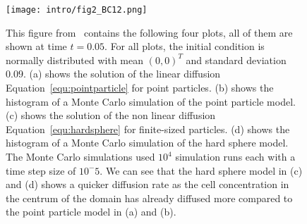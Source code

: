 \begin{figure}[t!]
	\centering
    \texttt{[image: intro/fig2\_BC12.png]}
    \caption{
    This figure from~\cite{Bruna2012} contains the following four plots, all of them are shown at time \( t=0.05 \). 
	For all plots, the initial condition is normally distributed with mean $(0,0)^T$ and standard deviation $0.09$. 
    (a) shows the solution of the linear diffusion Equation~\eqref{equ:pointparticle} for point particles. 
    (b) shows the histogram of a Monte Carlo simulation of the point particle model. 
    (c) shows the solution of the non linear diffusion Equation~\eqref{equ:hardsphere} for finite-sized particles. 
    (d) shows the histogram of a Monte Carlo simulation of the hard sphere model. 
    The Monte Carlo simulations used $10^4$ simulation runs each with a time step size of $10^-5$.
	We can see that the hard sphere model in (c) and (d) shows a quicker diffusion rate as the cell concentration in the centrum of the domain has already diffused more compared to the point particle model in (a) and (b). 
    }
    \label{fig:fig2BC12}
\end{figure}

